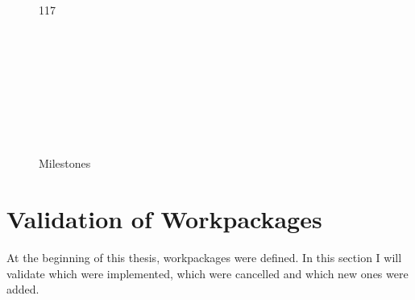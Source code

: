 \begin{figure}[ht]
	\begin{ganttchart}[
		hgrid,
		vgrid,
		x unit=7mm,
		y unit chart=10mm,
		milestone label font = \footnotesize
		]{1}{17}
		\\
		\\
		
		\\
		\\
		\\
		\\
		\\
		\\
		\\
	\end{ganttchart}
	\caption{Milestones}
	\label{apdx-fig:milestones}
\end{figure}

\section{Validation of Workpackages}

At the beginning of this thesis, workpackages were defined. In this section I will validate which were implemented, which were cancelled and which new ones were added. 


